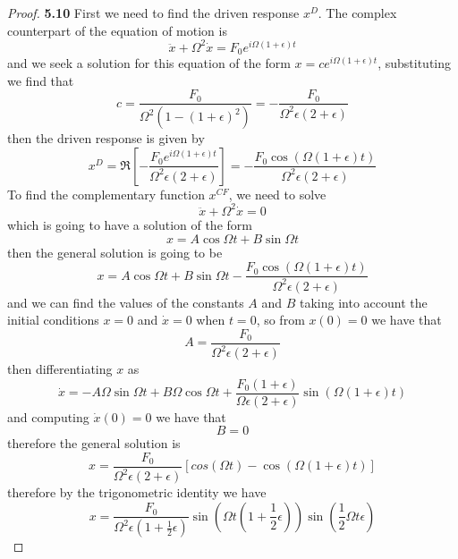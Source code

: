 \documentclass[11pt]{article}
\theoremstyle{definition}
\begin{document}
	\begin{proof}{\textbf{5.10}}
        First we need to find the driven response $x^D$. The complex
        counterpart of the equation of motion is
        $$\ddot{x} + \Omega^2\dot{x} = F_0 e^{i\Omega(1+\epsilon)t}$$
        and we seek a solution for this equation of the form
        $x = ce^{i\Omega(1+\epsilon)t}$, substituting we find that
        $$c = \frac{F_0}{\Omega^2(1-(1+\epsilon)^2)} = -\frac{F_0}{\Omega^2\epsilon(2 +\epsilon)}$$
        then the driven response is given by
        $$x^D = \Re\left[-\frac{F_0e^{i\Omega(1+\epsilon)t}}{\Omega^2\epsilon(2 +\epsilon)}\right]
            = -\frac{F_0\cos{(\Omega(1+\epsilon)t)}}{\Omega^2\epsilon(2 +\epsilon)}$$
        To find the complementary function $x^{CF}$, we need to solve
        $$\ddot{x} + \Omega^2\dot{x} = 0$$
        which is going to have a solution of the form
        $$x = A\cos{\Omega t} + B\sin{\Omega t}$$
        then the general solution is going to be
        $$x = A\cos{\Omega t} + B\sin{\Omega t} -
            \frac{F_0\cos{(\Omega(1+\epsilon)t)}}{\Omega^2\epsilon(2 +\epsilon)}$$
        and we can find the values of the constants $A$ and $B$ taking into
        account the initial conditions $x =0$ and $\dot{x} = 0$ when $t=0$, so
        from $x(0) = 0$ we have that
        $$A = \frac{F_0}{\Omega^2\epsilon(2 +\epsilon)}$$
        then differentiating $x$ as
        $$\dot{x} = -A\Omega\sin{\Omega t} + B\Omega\cos{\Omega t} + 
            \frac{F_0(1+\epsilon)}{\Omega\epsilon(2 +\epsilon)}\sin{(\Omega(1+\epsilon)t)}$$
        and computing $\dot{x}(0) = 0$ we have that
        $$B = 0$$
        therefore the general solution is
        $$x = \frac{F_0}{\Omega^2\epsilon(2 +\epsilon)}[cos{(\Omega t)} - \cos{(\Omega(1+\epsilon)t)}]$$
        therefore by the trigonometric identity we have
        $$x = \frac{F_0}{\Omega^2\epsilon(1 +\frac{1}{2}\epsilon)}\sin{(\Omega t(1 +\frac{1}{2}\epsilon))}\sin{(\frac{1}{2}\Omega t\epsilon)}$$    
    \end{proof}
\end{document}
